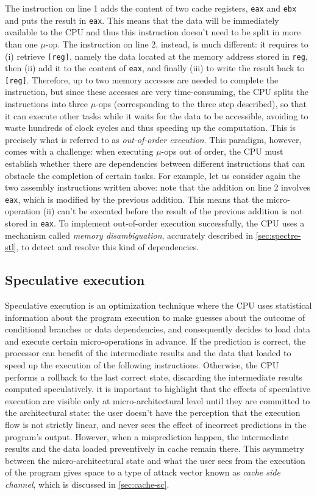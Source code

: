 \documentclass[target=mst,aauheader=aics]{thud}
\theoremstyle{definition}
\begin{document}
	The instruction on line 1 adds the content of two cache registers, \texttt{eax} and \texttt{ebx} and puts the result in \texttt{eax}. This means that the data will be immediately available to the CPU and thus this instruction doesn't need to be split in more than one $\mu$-op. The instruction on line 2, instead, is much different: it requires to (i) retrieve \texttt{[reg]}, namely the data located at the memory address stored in \texttt{reg}, then (ii) add it to the content of \texttt{eax}, and finally (iii) to write the result back to \texttt{[reg]}. Therefore, up to two memory accesses are needed to complete the instruction, but since these accesses are very time-consuming, the CPU splits the instructions into three $\mu$-ops (corresponding to the three step described), so that it can execute other tasks while it waits for the data to be accessible, avoiding to waste hundreds of clock cycles and thus speeding up the computation. This is precisely what is referred to as \textit{out-of-order execution}. This paradigm, however, comes with a challenge: when executing $\mu$-ops out of order, the CPU must establish whether there are dependencies between different instructions that can obstacle the completion of certain tasks.	For example, let us consider again the two assembly instructions written above: note that the addition on line 2 involves \texttt{eax}, which is modified by the previous addition. This means that the micro-operation (ii) can't be executed before the result of the previous addition is not stored in \texttt{eax}. To implement out-of-order execution successfully, the CPU uses a mechanism called \textit{memory disambiguation}, accurately described in \ref{sec:spectre-stl}, to detect and resolve this kind of dependencies. 
	
	\subsection{Speculative execution}\label{sec:speculative-exec}
	Speculative execution is an optimization technique where the CPU uses statistical information about the program execution to make guesses about the outcome of conditional branches or data dependencies, and consequently decides to load data and execute certain micro-operations in advance. If the prediction is correct, the processor can benefit of the intermediate results and the data that loaded to speed up the execution of the following instructions. Otherwise, the CPU performs a rollback to the last correct state, discarding the intermediate results computed speculatively. it is important to highlight that the effects of speculative execution are visible only at micro-architectural level until they are committed to the architectural state: the user doesn't have the perception that the execution flow is not strictly linear, and never sees the effect of incorrect predictions in the program's output. However, when a misprediction happen, the intermediate results and the data loaded preventively in cache remain there. This asymmetry between the micro-architectural state and what the user sees from the execution of the program gives space to a type of attack vector known as \textit{cache side channel}, which is discussed in \ref{sec:cache-sc}.
	
\end{document}

